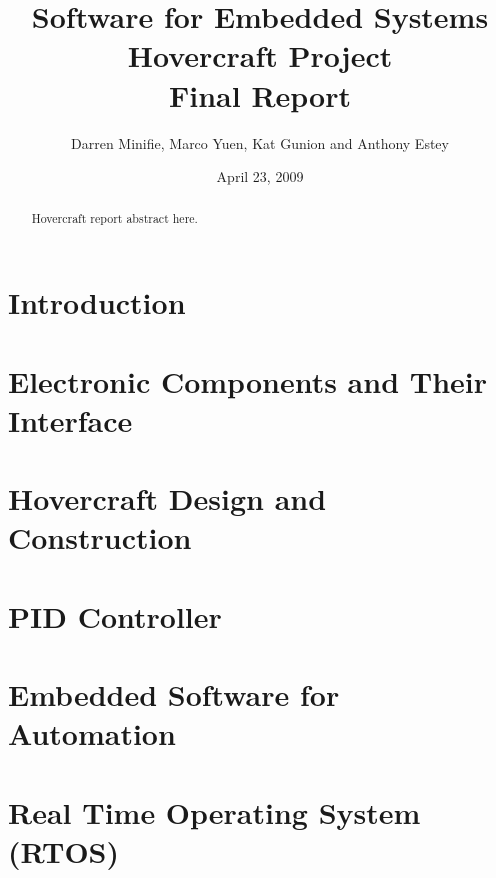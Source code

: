 \documentclass{article}
\begin{document}


\title{Software for Embedded Systems\\Hovercraft Project\\Final Report}


\author{Darren Minifie, Marco Yuen, Kat Gunion and Anthony Estey}

\date{April 23, 2009}
\maketitle
\begin{abstract}
Hovercraft report abstract here.
\end{abstract}

\tableofcontents
\listoffigures
\listoftables
\newpage





\section{Introduction}

\clearpage
\section{Electronic Components and Their Interface}

\clearpage
\section{Hovercraft Design and Construction}

\clearpage
\section{PID Controller}

\clearpage
\section{Embedded Software for Automation}
\label{embeddedSoftwareAutomation}

\clearpage
\section{Real Time Operating System (RTOS)}

\clearpage
\end{document}
